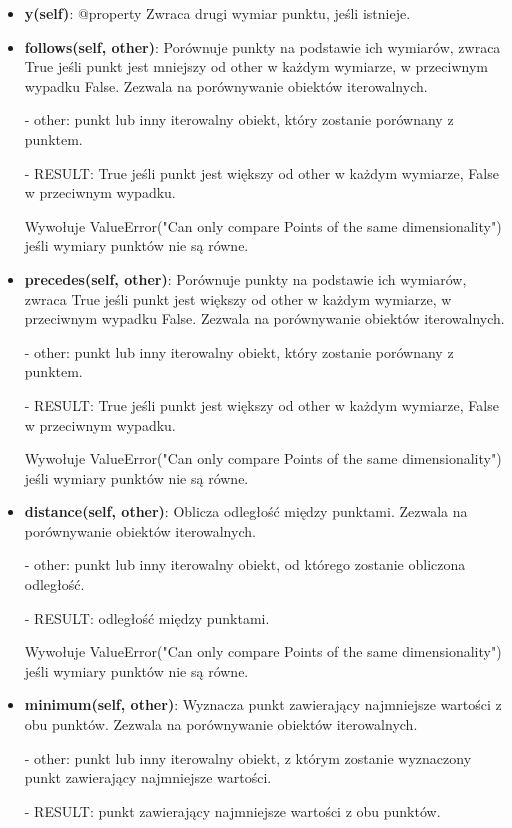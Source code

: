 \documentclass{lab}
\begin{document}
\begin{itemize}
    \item \textbf{y(self)}:
    @property Zwraca drugi wymiar punktu, jeśli istnieje.

    \item \textbf{follows(self, other)}:
    Porównuje punkty na podstawie ich wymiarów, zwraca True jeśli punkt jest mniejszy od other w każdym wymiarze, w przeciwnym wypadku False. Zezwala na porównywanie obiektów iterowalnych.

    - other: punkt lub inny iterowalny obiekt, który zostanie porównany z punktem.

    - RESULT: True jeśli punkt jest większy od other w każdym wymiarze, False w przeciwnym wypadku.

    Wywołuje ValueError("Can only compare Points of the same dimensionality") jeśli wymiary punktów nie są równe.

    \item \textbf{precedes(self, other)}:
    Porównuje punkty na podstawie ich wymiarów, zwraca True jeśli punkt jest większy od other w każdym wymiarze, w przeciwnym wypadku False. Zezwala na porównywanie obiektów iterowalnych.

    - other: punkt lub inny iterowalny obiekt, który zostanie porównany z punktem.

    - RESULT: True jeśli punkt jest większy od other w każdym wymiarze, False w przeciwnym wypadku.

    Wywołuje ValueError("Can only compare Points of the same dimensionality") jeśli wymiary punktów nie są równe.

    \item \textbf{distance(self, other)}:
    Oblicza odległość między punktami. Zezwala na porównywanie obiektów iterowalnych.

    - other: punkt lub inny iterowalny obiekt, od którego zostanie obliczona odległość.

    - RESULT: odległość między punktami.

    Wywołuje ValueError("Can only compare Points of the same dimensionality") jeśli wymiary punktów nie są równe.

    \item \textbf{minimum(self, other)}:
    Wyznacza punkt zawierający najmniejsze wartości z obu punktów. Zezwala na porównywanie obiektów iterowalnych.

    - other: punkt lub inny iterowalny obiekt, z którym zostanie wyznaczony punkt zawierający najmniejsze wartości.

    - RESULT: punkt zawierający najmniejsze wartości z obu punktów.


\end{itemize}
\end{document}
